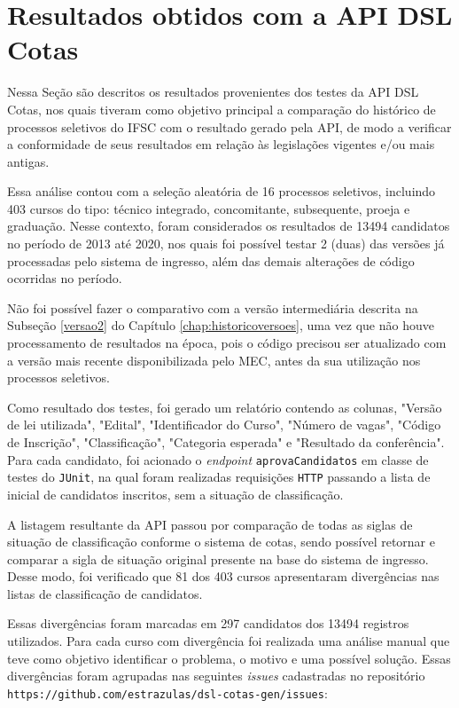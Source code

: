 \section{Resultados obtidos com a API DSL Cotas}
\label{sec:avaliacaoapi}

Nessa Seção são descritos os resultados provenientes dos testes da API DSL Cotas, nos quais tiveram como objetivo principal a comparação do histórico de processos seletivos do \gls{IFSC} com o resultado gerado pela API, de modo a verificar a conformidade de seus resultados em relação às legislações vigentes e/ou mais antigas.

Essa análise contou com a seleção aleatória de 16 processos seletivos, incluindo 403 cursos do tipo: técnico integrado, concomitante, subsequente, proeja e graduação. Nesse contexto, foram considerados os resultados de 13494 candidatos no período de 2013 até 2020, nos quais foi possível testar 2 (duas) das versões já processadas pelo sistema de ingresso, além das demais alterações de código ocorridas no período. 

Não foi possível fazer o comparativo com a versão intermediária descrita na Subseção \ref{versao2} do Capítulo \ref{chap:historicoversoes}, uma vez que não houve processamento de resultados na época, pois o código precisou ser atualizado com a versão mais recente disponibilizada pelo MEC, antes da sua utilização nos processos seletivos.

Como resultado dos testes, foi gerado um relatório contendo as colunas, "Versão de lei utilizada", "Edital", "Identificador do Curso", "Número de vagas", "Código de Inscrição", "Classificação", "Categoria esperada" e "Resultado da conferência". Para cada candidato, foi acionado o \textit{endpoint} \texttt{aprovaCandidatos} em classe de testes do \texttt{JUnit}, na qual foram realizadas requisições \texttt{HTTP} passando a lista de inicial de candidatos inscritos, sem a situação de classificação.

A listagem resultante da API passou por comparação de todas as siglas de situação de classificação conforme o sistema de cotas, sendo possível retornar e comparar a sigla de situação original presente na base do sistema de ingresso. Desse modo, foi verificado que 81 dos 403 cursos apresentaram divergências nas listas de classificação de candidatos.

Essas divergências foram marcadas em 297 candidatos dos 13494 registros utilizados. Para cada curso com divergência foi realizada uma análise manual que teve como objetivo identificar o problema, o motivo e uma possível solução. Essas divergências foram agrupadas nas seguintes \textit{issues} cadastradas no repositório \texttt{https://github.com/estrazulas/dsl-cotas-gen/issues}:

